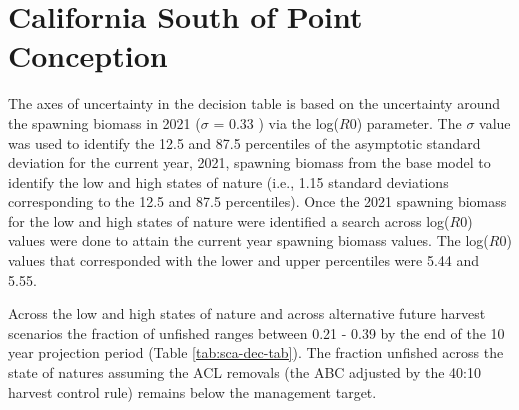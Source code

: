 \documentclass[11pt,
  english,
  a4paper,
]{article}
\begin{document}
\clearpage


\hypertarget{california-south-of-point-conception}{%
\section{California South of Point Conception}\label{california-south-of-point-conception}}

\leavevmode\tagmcend\tagstructend


The axes of uncertainty in the decision table is based on the uncertainty around the spawning biomass in 2021 ({\(\sigma\)\leavevmode\tagmcend\tagstructend} = 0.33 ) via the log({\(R0\)\leavevmode\tagmcend\tagstructend}) parameter. The {\(\sigma\)\leavevmode\tagmcend\tagstructend} value was used to identify the 12.5 and 87.5 percentiles of the asymptotic standard deviation for the current year, 2021, spawning biomass from the base model to identify the low and high states of nature (i.e., 1.15 standard deviations corresponding to the 12.5 and 87.5 percentiles). Once the 2021 spawning biomass for the low and high states of nature were identified a search across log({\(R0\)\leavevmode\tagmcend\tagstructend}) values were done to attain the current year spawning biomass values. The log({\(R0\)\leavevmode\tagmcend\tagstructend}) values that corresponded with the lower and upper percentiles were 5.44 and 5.55.

\leavevmode\tagmcend\tagstructend\par


Across the low and high states of nature and across alternative future harvest scenarios the fraction of unfished ranges between 0.21 - 0.39 by the end of the 10 year projection period (Table \ref{tab:sca-dec-tab}). The fraction unfished across the state of natures assuming the ACL removals (the ABC adjusted by the 40:10 harvest control rule) remains below the management target.

\leavevmode\tagmcend\tagstructend\par



\clearpage
\end{document}

